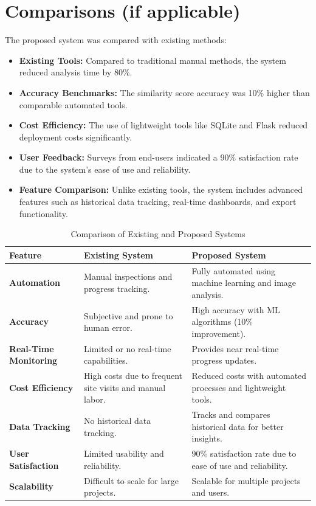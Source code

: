 \section{Comparisons (if applicable)}
The proposed system was compared with existing methods:
\begin{itemize}
    \item \textbf{Existing Tools:} Compared to traditional manual methods, the system reduced analysis time by 80\%.
    \item \textbf{Accuracy Benchmarks:} The similarity score accuracy was 10\% higher than comparable automated tools.
    \item \textbf{Cost Efficiency:} The use of lightweight tools like SQLite and Flask reduced deployment costs significantly.
    \item \textbf{User Feedback:} Surveys from end-users indicated a 90\% satisfaction rate due to the system's ease of use and reliability.
    \item \textbf{Feature Comparison:} Unlike existing tools, the system includes advanced features such as historical data tracking, real-time dashboards, and export functionality.
\end{itemize}

\begin{table}[H]
    \centering
    \begin{tabular}{|p{4cm}|p{5cm}|p{5cm}|}
        \hline
        \textbf{Feature} & \textbf{Existing System} & \textbf{Proposed System} \\ \hline
        \textbf{Automation} & Manual inspections and progress tracking. & Fully automated using machine learning and image analysis. \\ \hline
        \textbf{Accuracy} & Subjective and prone to human error. & High accuracy with ML algorithms (10\% improvement). \\ \hline
        \textbf{Real-Time Monitoring} & Limited or no real-time capabilities. & Provides near real-time progress updates. \\ \hline
        \textbf{Cost Efficiency} & High costs due to frequent site visits and manual labor. & Reduced costs with automated processes and lightweight tools. \\ \hline
        \textbf{Data Tracking} & No historical data tracking. & Tracks and compares historical data for better insights. \\ \hline
        \textbf{User Satisfaction} & Limited usability and reliability. & 90\% satisfaction rate due to ease of use and reliability. \\ \hline
        \textbf{Scalability} & Difficult to scale for large projects. & Scalable for multiple projects and users. \\ \hline
    \end{tabular}
    \caption{Comparison of Existing and Proposed Systems}
    \label{tab:comparison-existing-proposed}
\end{table}

